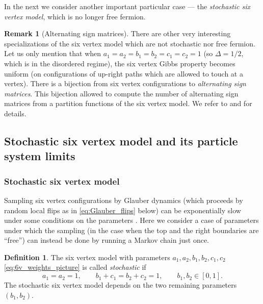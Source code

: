 \documentclass[letterpaper,11pt,oneside,reqno]{article}
\numberwithin{equation}{section}
\theoremstyle{definition}
\newtheorem{definition}[proposition]{Definition}
\newtheorem{remark}[proposition]{Remark}
\theoremstyle{remark}
\begin{document}
In the next 
we consider another important particular case --- the 
\emph{stochastic six vertex model}, which is no longer free fermion.

\begin{remark}[Alternating sign matrices]
	There are other very interesting specializations
	of the six vertex model 
	which are not stochastic
	nor free fermion. Let us only mention
	that when $a_1=a_2=b_1=b_2=c_1=c_2=1$ (so $\Delta=1/2$, which is in the disordered regime),
	the six vertex Gibbs property becomes uniform
	(on configurations of up-right paths which are allowed to touch at a vertex).
	There is a bijection from six vertex configurations to 
	\emph{alternating sign matrices}. 
	This bijection allowed to compute the number of alternating sign matrices
	from a partition functions of the six vertex model.
	We refer to 
	\cite{kuperberg1996another} and
	\cite{Propp2001} for details.
\end{remark}

\subsection{Stochastic six vertex model and its particle system limits}
\label{sub:s6v_and_degenerations}

\subsubsection{Stochastic six vertex model}

Sampling six vertex configurations 
by Glauber dynamics (which proceeds by random local flips as in \eqref{eq:Glauber_flips} below)
can be exponentially slow under some conditions on the parameters
\cite{FahrbachRandall2019}.
Here we consider a case of parameters 
under which the sampling 
(in the case when the top and the right boundaries are ``free'')
can instead be done by running a Markov chain just once.

\begin{definition}
	\label{def:s6v}
	The six vertex model with parameters $a_1,a_2,b_1,b_2,c_1,c_2$ 
	\eqref{eq:6v_weights_picture}
	is called \emph{stochastic}
	if 
	\begin{equation}
		\label{eq:s6v_condition}
		a_1=a_2=1,\qquad 
		b_1+c_1=b_2+c_2=1,\qquad 
		b_1,b_2\in[0,1].
	\end{equation}
	The stochastic six vertex model depends on the 
	two remaining parameters
	$(b_1,b_2)$.
\end{definition}
\end{document}
